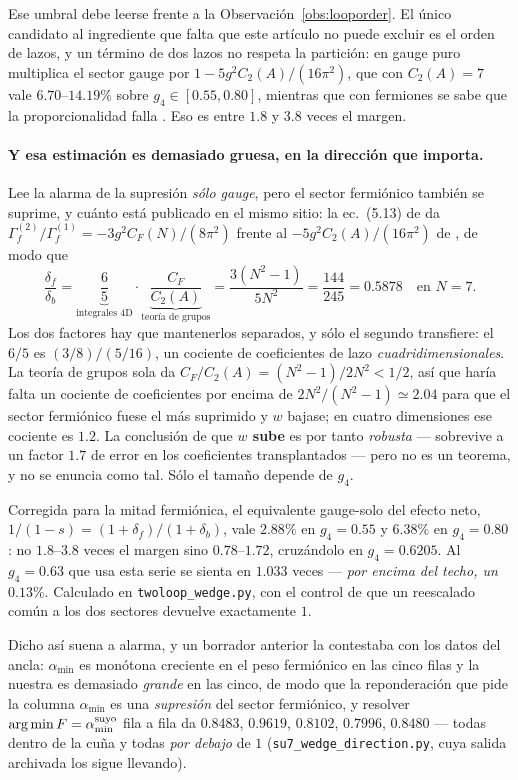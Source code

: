 \documentclass[11pt,a4paper]{article}
\newcommand{\amin}{\alpha_{\min}}
\begin{document}
Ese umbral debe leerse frente a la Observación~\ref{obs:looporder}. El único candidato al ingrediente
que falta que este artículo no puede excluir es el orden de lazos, y un término de dos lazos no
respeta la partición: en gauge puro multiplica el sector gauge por $1-5g^2C_2(A)/(16\pi^2)$, que con
$C_2(A)=7$ vale $6.70$--$14.19\%$ sobre $g_4\in[0.55,0.80]$, mientras que con fermiones se sabe que
la proporcionalidad falla \cite{GuoDu}. Eso es entre $1.8$ y $3.8$ veces el margen.

\paragraph{Y esa estimación es demasiado gruesa, en la dirección que importa.} Lee la alarma de la
supresión \emph{sólo gauge}, pero el sector fermiónico también se suprime, y cuánto está publicado en
el mismo sitio: la ec.~(5.13) de \cite{GuoDu} da
$\Gamma^{(2)}_f/\Gamma^{(1)}_f=-3g^2C_F(N)/(8\pi^2)$ frente al $-5g^2C_2(A)/(16\pi^2)$ de
\cite{DGKA}, de modo que
\[
  \frac{\delta_f}{\delta_b}=\underbrace{\frac{6}{5}}_{\text{integrales 4D}}\cdot
  \underbrace{\frac{C_F}{C_2(A)}}_{\text{teoría de grupos}}
  =\frac{3(N^2-1)}{5N^2}=\frac{144}{245}=0.5878 \quad\text{en } N=7 .
\]
Los dos factores hay que mantenerlos separados, y sólo el segundo transfiere: el $6/5$ es
$(3/8)\big/(5/16)$, un cociente de coeficientes de lazo \emph{cuadridimensionales}. La teoría de
grupos sola da $C_F/C_2(A)=(N^2-1)/2N^2<1/2$, así que haría falta un cociente de coeficientes por
encima de $2N^2/(N^2-1)\simeq2.04$ para que el sector fermiónico fuese el más suprimido y $w$ bajase;
en cuatro dimensiones ese cociente es $1.2$. La conclusión de que \textbf{$w$ sube} es por tanto
\emph{robusta} --- sobrevive a un factor $1.7$ de error en los coeficientes transplantados --- pero
no es un teorema, y no se enuncia como tal. Sólo el tamaño depende de $g_4$.

Corregida para la mitad fermiónica, el equivalente gauge-solo del efecto neto,
$1/(1-s)=(1+\delta_f)/(1+\delta_b)$, vale $2.88\%$ en $g_4=0.55$ y $6.38\%$ en $g_4=0.80$: no
$1.8$--$3.8$ veces el margen sino $0.78$--$1.72$, cruzándolo en $g_4=0.6205$. Al $g_4=0.63$ que usa
esta serie se sienta en $1.033$ veces --- \emph{por encima del techo, un $0.13\%$}. Calculado en
\texttt{twoloop\_wedge.py}, con el control de que un reescalado común a los dos sectores devuelve
exactamente $1$.

Dicho así suena a alarma, y un borrador anterior la contestaba con los datos del ancla: $\amin$ es
monótona creciente en el peso fermiónico en las cinco filas y la nuestra es demasiado \emph{grande}
en las cinco, de modo que la reponderación que pide la columna $\amin$ es una \emph{supresión} del
sector fermiónico, y resolver $\arg\min F=\amin^{\rm suyo}$ fila a fila da $0.8483$, $0.9619$,
$0.8102$, $0.7996$, $0.8480$ --- todas dentro de la cuña y todas \emph{por debajo} de $1$
(\texttt{su7\_\allowbreak wedge\_\allowbreak direction.py}, cuya salida archivada los sigue llevando).
\end{document}
